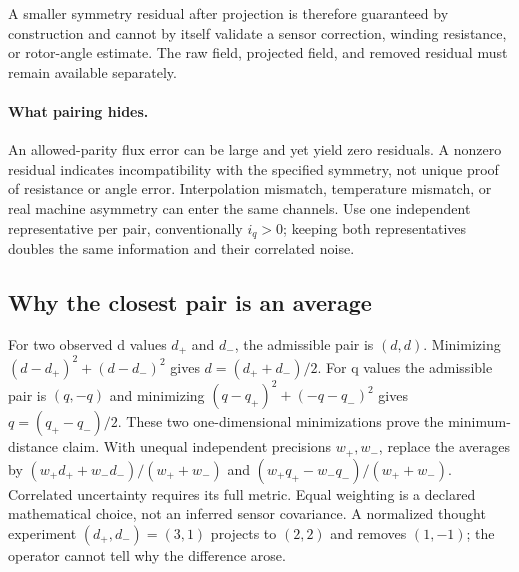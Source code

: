 A smaller symmetry residual after projection is therefore guaranteed by construction and cannot by itself validate a sensor correction, winding resistance, or rotor-angle estimate. The raw field, projected field, and removed residual must remain available separately.

\paragraph{What pairing hides.}
An allowed-parity flux error can be large and yet yield zero residuals.
A nonzero residual indicates incompatibility with the specified symmetry,
not unique proof of resistance or angle error. Interpolation mismatch,
temperature mismatch, or real machine asymmetry can enter the same channels.
Use one independent representative per pair, conventionally $i_q>0$; keeping
both representatives doubles the same information and their correlated noise.


\subsection{Why the closest pair is an average}
For two observed d values $d_+$ and $d_-$, the admissible pair is $(d,d)$.
Minimizing $(d-d_+)^2+(d-d_-)^2$ gives $d=(d_++d_-)/2$.
For q values the admissible pair is $(q,-q)$ and minimizing
$(q-q_+)^2+(-q-q_-)^2$ gives $q=(q_+-q_-)/2$.
These two one-dimensional minimizations prove the minimum-distance claim.
With unequal independent precisions $w_+,w_-$, replace the averages by
$(w_+d_++w_-d_-)/(w_++w_-)$ and
$(w_+q_+-w_-q_-)/(w_++w_-)$. Correlated uncertainty requires its full metric.
Equal weighting is a declared mathematical choice, not an inferred sensor
covariance. A normalized thought experiment $(d_+,d_-)=(3,1)$ projects to
$(2,2)$ and removes $(1,-1)$; the operator cannot tell why the difference arose.
